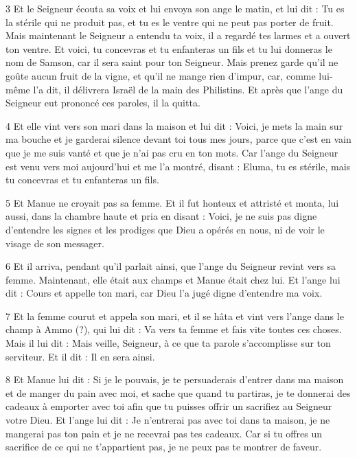 \par 3 Et le Seigneur écouta sa voix et lui envoya son ange le matin, et lui dit : Tu es la stérile qui ne produit pas, et tu es le ventre qui ne peut pas porter de fruit. Mais maintenant le Seigneur a entendu ta voix, il a regardé tes larmes et a ouvert ton ventre. Et voici, tu concevras et tu enfanteras un fils et tu lui donneras le nom de Samson, car il sera saint pour ton Seigneur. Mais prenez garde qu'il ne goûte aucun fruit de la vigne, et qu'il ne mange rien d'impur, car, comme lui-même l'a dit, il délivrera Israël de la main des Philistins. Et après que l'ange du Seigneur eut prononcé ces paroles, il la quitta.

\par 4 Et elle vint vers son mari dans la maison et lui dit : Voici, je mets la main sur ma bouche et je garderai silence devant toi tous mes jours, parce que c'est en vain que je me suis vanté et que je n'ai pas cru en ton mots. Car l'ange du Seigneur est venu vers moi aujourd'hui et me l'a montré, disant : Eluma, tu es stérile, mais tu concevras et tu enfanteras un fils.

\par 5 Et Manue ne croyait pas sa femme. Et il fut honteux et attristé et monta, lui aussi, dans la chambre haute et pria en disant : Voici, je ne suis pas digne d'entendre les signes et les prodiges que Dieu a opérés en nous, ni de voir le visage de son messager.

\par 6 Et il arriva, pendant qu'il parlait ainsi, que l'ange du Seigneur revint vers sa femme. Maintenant, elle était aux champs et Manue était chez lui. Et l'ange lui dit : Cours et appelle ton mari, car Dieu l'a jugé digne d'entendre ma voix.

\par 7 Et la femme courut et appela son mari, et il se hâta et vint vers l'ange dans le champ à Ammo (?), qui lui dit : Va vers ta femme et fais vite toutes ces choses. Mais il lui dit : Mais veille, Seigneur, à ce que ta parole s'accomplisse sur ton serviteur. Et il dit : Il en sera ainsi.

\par 8 Et Manue lui dit : Si je le pouvais, je te persuaderais d'entrer dans ma maison et de manger du pain avec moi, et sache que quand tu partiras, je te donnerai des cadeaux à emporter avec toi afin que tu puisses offrir un sacrifiez au Seigneur votre Dieu. Et l'ange lui dit : Je n'entrerai pas avec toi dans ta maison, je ne mangerai pas ton pain et je ne recevrai pas tes cadeaux. Car si tu offres un sacrifice de ce qui ne t'appartient pas, je ne peux pas te montrer de faveur.

